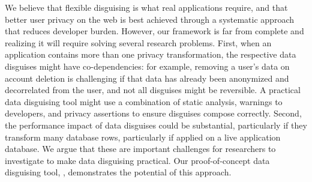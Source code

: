 %
We believe that flexible disguising is what real applications require, and that better user
privacy on the web is best achieved through a systematic approach that reduces developer
burden.
%
However, our framework is far from complete and realizing it will require solving several
research problems.
%
First, when an application contains more than one privacy transformation, the respective
data disguises might have co-dependencies: for example, removing a user's data on account
deletion is challenging if that data has already been anonymized and decorrelated from the
user, and not all disguises might be reversible.
%
A practical data disguising tool might use a combination of static analysis, warnings to
developers, and privacy assertions to ensure disguises compose correctly.
%
Second, the performance impact of data disguises could be substantial, particularly if they
transform many database rows, particularly if applied on a live application database.
%
We argue that these are important challenges for researchers to investigate to make data
disguising practical.
%
Our proof-of-concept data disguising tool, \sys, demonstrates the potential of this
approach.
%
%
%
%
%
%

